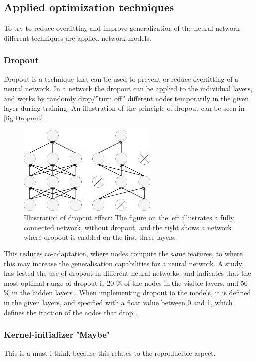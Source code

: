 \subsection{Applied optimization techniques}
To try to reduce overfitting and improve generalization of the neural network different techniques are applied network models. 

\subsubsection{Dropout}
Dropout is a technique that can be used to prevent or reduce overfitting of a neural network. In a network the dropout can be applied to the individual layers, and works by randomly drop/”turn off” different nodes temporarily in the given layer during training. An illustration of the principle of dropout can be seen in \autoref{fig:Dropout}.  

\begin{figure} [H]
\centering
\includegraphics[width=0.6\textwidth]{figures/Dropout}
\caption{Illustration of dropout effect: The figure on the left illustrates a fully connected network, without dropout, and the right shows a network where dropout is enabled on the first three layers.}
\label{fig:Dropout}  
\end{figure}

This reduces co-adaptation, where nodes compute the same features, to where this may increase the generalisation capabilities for a neural network.\citep{Srivastava2014}  
A study, has tested the use of dropout in different neural networks, and indicates that the most optimal range of dropout is 20 \% of the nodes in the visible layers, and 50 \% in the hidden layers \citep{Srivastava2014}.
When implementing dropout to the models, it is defined in the given layers, and specified with a float value between 0 and 1, which defines the fraction of the nodes that drop \citep{Chollet2015}.


\subsubsection{Kernel-initializer 'Maybe'}
This is a must i think because this relates to the reproducible aspect. 


